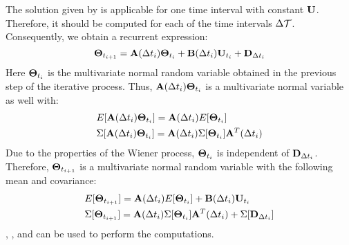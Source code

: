 The solution given by  is applicable for one time interval with constant $\mathbf{U}$. Therefore, it should be computed for each of the time intervals $\Delta \mathcal{T}$. Consequently, we obtain a recurrent expression:
\begin{equation} \equlabel{recurrence}
  \vtemperature_{\time_{i + 1}} = \m{A}(\timeinterval_i) \vtemperature_{\time_i} + \m{B}(\timeinterval_i) \vpower_{\time_i} + \m{D}_{\timeinterval_i}
\end{equation}
Here $\mathbf{\Theta}_{t_i}$ is the multivariate normal random variable obtained in the previous step of the iterative process. Thus, $\mathbf{A}(\Delta t_i) \mathbf{\Theta}_{t_i}$ is a multivariate normal variable as well with:
\begin{align*}
  & E[\mathbf{A}(\Delta t_i) \mathbf{\Theta}_{t_i}] = \mathbf{A}(\Delta t_i)E[\mathbf{\Theta}_{t_i}] \\
  & \Sigma[\mathbf{A}(\Delta t_i) \mathbf{\Theta}_{t_i}] = \mathbf{A}(\Delta t_i) \Sigma[\mathbf{\Theta}_{t_i}] \mathbf{A}^T(\Delta t_i)
\end{align*}
Due to the properties of the Wiener process, $\mathbf{\Theta}_{t_i}$ is independent of $\mathbf{D}_{\Delta t_i}$. Therefore, $\mathbf{\Theta}_{t_{i+1}}$ is a multivariate normal random variable with the following mean and covariance:
\begin{align*}
  & E[\mathbf{\Theta}_{t_{i+1}}] = \mathbf{A}(\Delta t_i)E[\mathbf{\Theta}_{t_i}] + \mathbf{B}(\Delta t_i) \mathbf{U}_{t_i} \\
  & \Sigma[\mathbf{\Theta}_{t_{i+1}}] = \mathbf{A}(\Delta t_i) \Sigma[\mathbf{\Theta}_{t_i}] \mathbf{A}^T(\Delta t_i) + \Sigma[\mathbf{D}_{\Delta t_i}]
\end{align*}
, , and  can be used to perform the computations.

